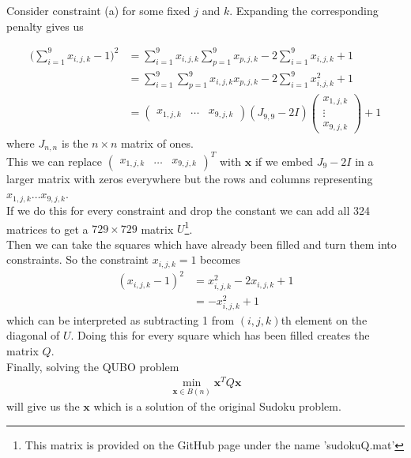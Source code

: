 \documentclass{article}
\begin{document}
\noindent Consider constraint (a) for some fixed \(j\) and \(k\). Expanding the corresponding penalty gives us

\begin{align*}
    \bigg(\sum_{i=1}^9 x_{i,j,k} - 1\bigg)^2 &= \sum_{i=1}^9 x_{i,j,k}\sum_{p=1}^9 x_{p,j,k} -2\sum_{i=1}^9 x_{i,j,k} + 1  \\
    &= \sum_{i=1}^9\sum_{p=1}^9 x_{i,j,k}x_{p,j,k} -2\sum_{i=1}^9 x_{i,j,k}^2 + 1 \\
    &= \begin{pmatrix}
        x_{1,j,k} & \dots & x_{9,j,k}
    \end{pmatrix} (J_{9,9} - 2I) \begin{pmatrix}
        x_{1,j,k} \\
        \vdots \\
        x_{9,j,k}
    \end{pmatrix} + 1
\end{align*}
where \(J_{n, n}\) is the \(n \times n\) matrix of ones. \\

\noindent This we can replace \(\begin{pmatrix}
        x_{1,j,k} & \dots & x_{9,j,k}
    \end{pmatrix}^T\) with \(\mathbf{x}\) if we
    embed \(J_9 - 2I\) in a larger matrix with zeros everywhere but the rows and columns representing \(x_{1,j,k} \dots x_{9,j,k}\).\\

\noindent If we do this for every constraint and drop the constant we can add all 324 matrices to get a \(729 \times 729\) matrix \(U\)\footnote{This matrix is provided on the GitHub page under the name 'sudokuQ.mat' }.\\

\noindent Then we can take the squares which have already been filled and turn them into constraints. So the constraint \(x_{i,j,k} = 1\) becomes 
\begin{align*}
    (x_{i,j,k} - 1)^2 &= x_{i,j,k}^2 - 2x_{i,j,k} + 1 \\
    &= -x_{i,j,k}^2 + 1
\end{align*}
which can be interpreted as subtracting 1 from \((i,j,k)\)th element on the diagonal of \(U\). Doing this for every square which has been filled creates the matrix \(Q\).\\

\noindent Finally, solving the QUBO problem
\begin{align*}
    \min_{\mathbf{x} \in B(n)} \mathbf{x}^T Q \mathbf{x}
\end{align*}
will give us the \(\mathbf{x}\) which is a solution of the original Sudoku problem.\\
\end{document}
